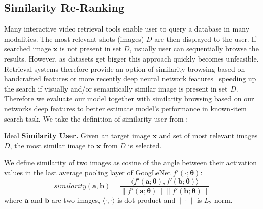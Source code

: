 \subsection{Similarity Re-Ranking}
Many interactive video retrieval tools enable user to query a database in many modalities. The most relevant shots (images) $D$ are then displayed to the user. If searched image $\bm{x}$ is not present in set $D$, usually user can sequentially browse the results. However, as datasets get bigger this approach quickly becomes unfeasible. Retrieval systems therefore provide an option of similarity browsing based on handcrafted features or more recently deep neural network features~\cite{lokovc2018revisiting, barthel2018fusing} speeding up the search if visually and/or semantically similar image is present in set $D$. Therefore we evaluate our model together with similarity browsing based on our networks deep features to better estimate model's performance in known-item search task. We take the definition of similarity user from \cite{kovalvcik2017comparison}:
\begin{description}[labelwidth=1em, leftmargin=!]
	\item Ideal \textbf{Similarity User.} Given an target image $\bm{x}$ and set of most relevant images $D$, the most similar image to $\bm{x}$ from $D$ is selected.
\end{description}
We define similarity of two images as cosine of the angle between their activation values in the last average pooling layer of GoogLeNet $f'(\cdot;\bm{\theta})$:
\begin{equation}
similarity(\bm{a},\bm{b}) = \frac{\langle f'(\bm{a};\bm{\theta}),f'(\bm{b};\bm{\theta})\rangle}{\|f'(\bm{a};\bm{\theta})\|\|f'(\bm{b};\bm{\theta})\|}
\end{equation}
where $\bm{a}$ and $\bm{b}$ are two images, $\langle\cdot,\cdot\rangle$ is dot product and $\|\cdot\|$ is $L_2$ norm.

